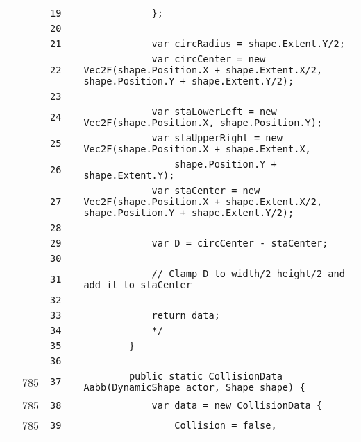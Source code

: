 \documentclass[a4paper,landscape,10pt]{article}
\begin{document}
\begin{longtable}[l]{lrrll}
\cellcolor{gray} &  & \verb~19~ & & \verb~            };~\\
\cellcolor{gray} &  & \verb~20~ & & \verb~~\\
\cellcolor{gray} &  & \verb~21~ & & \verb~            var circRadius = shape.Extent.Y/2;~\\
\cellcolor{gray} &  & \verb~22~ & & \verb~            var circCenter = new Vec2F(shape.Position.X + shape.Extent.X/2, shape.Position.Y + shape.Extent.Y/2);~\\
\cellcolor{gray} &  & \verb~23~ & & \verb~~\\
\cellcolor{gray} &  & \verb~24~ & & \verb~            var staLowerLeft = new Vec2F(shape.Position.X, shape.Position.Y);~\\
\cellcolor{gray} &  & \verb~25~ & & \verb~            var staUpperRight = new Vec2F(shape.Position.X + shape.Extent.X,~\\
\cellcolor{gray} &  & \verb~26~ & & \verb~                shape.Position.Y + shape.Extent.Y);~\\
\cellcolor{gray} &  & \verb~27~ & & \verb~            var staCenter = new Vec2F(shape.Position.X + shape.Extent.X/2, shape.Position.Y + shape.Extent.Y/2);~\\
\cellcolor{gray} &  & \verb~28~ & & \verb~~\\
\cellcolor{gray} &  & \verb~29~ & & \verb~            var D = circCenter - staCenter;~\\
\cellcolor{gray} &  & \verb~30~ & & \verb~~\\
\cellcolor{gray} &  & \verb~31~ & & \verb~            // Clamp D to width/2 height/2 and add it to staCenter~\\
\cellcolor{gray} &  & \verb~32~ & & \verb~~\\
\cellcolor{gray} &  & \verb~33~ & & \verb~            return data;~\\
\cellcolor{gray} &  & \verb~34~ & & \verb~            */~\\
\cellcolor{gray} &  & \verb~35~ & & \verb~        }~\\
\cellcolor{gray} &  & \verb~36~ & & \verb~~\\
\cellcolor{green} & 785 & \verb~37~ & & \verb~        public static CollisionData Aabb(DynamicShape actor, Shape shape) {~\\
\cellcolor{green} & 785 & \verb~38~ & & \verb~            var data = new CollisionData {~\\
\cellcolor{green} & 785 & \verb~39~ & & \verb~                Collision = false,~\\

\end{longtable}
\end{document}
